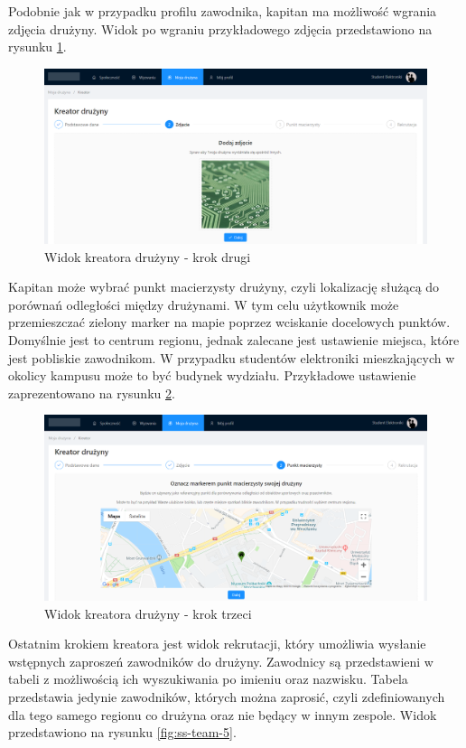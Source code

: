 Podobnie jak w przypadku profilu zawodnika, kapitan ma możliwość wgrania zdjęcia drużyny. Widok po wgraniu przykładowego zdjęcia przedstawiono na rysunku \ref{fig:ss-team-2}.

\begin{figure}[H]
\centering
\includegraphics[width=\linewidth]{065-dzialanie/rys/ss-team-2.PNG}
\caption{Widok kreatora drużyny - krok drugi}
\label{fig:ss-team-2}
\end{figure}

Kapitan może wybrać punkt macierzysty drużyny, czyli lokalizację służącą do porównań odległości między drużynami. W tym celu użytkownik może przemieszczać zielony marker na mapie poprzez wciskanie docelowych punktów. Domyślnie jest to centrum regionu, jednak zalecane jest ustawienie miejsca, które jest pobliskie zawodnikom. W przypadku studentów elektroniki mieszkających w okolicy kampusu może to być budynek wydziału. Przykładowe ustawienie zaprezentowano na rysunku \ref{fig:ss-team-3}. 

\begin{figure}[H]
\centering
\includegraphics[width=\linewidth]{065-dzialanie/rys/ss-team-3.PNG}
\caption{Widok kreatora drużyny - krok trzeci}
\label{fig:ss-team-3}
\end{figure}

Ostatnim krokiem kreatora jest widok rekrutacji, który umożliwia wysłanie wstępnych zaproszeń zawodników do drużyny. Zawodnicy są przedstawieni w tabeli z możliwością ich wyszukiwania po imieniu oraz nazwisku. Tabela przedstawia jedynie zawodników, których można zaprosić, czyli zdefiniowanych dla tego samego regionu co drużyna oraz nie będący w innym zespole. Widok przedstawiono na rysunku \ref{fig:ss-team-5}.

